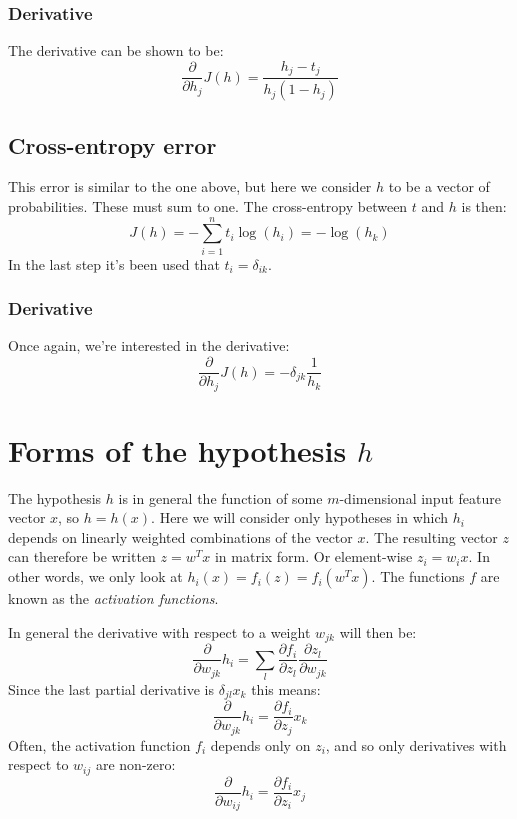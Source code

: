 \documentclass[12pt, a4paper]{article}
\numberwithin{equation}{section}
\begin{document}
\subsubsection{Derivative}
The derivative can be shown to be:
\begin{equation}
\frac{\partial}{\partial h_j}J(h)=\frac{h_j-t_j}{h_j(1-h_j)}
\end{equation}

\subsection{Cross-entropy error}
This error is similar to the one above, but here we consider $h$ to be a vector of probabilities. These must sum to one. The cross-entropy between $t$ and $h$ is then:
\begin{equation}
\label{error_crossentropy}
J(h)=-\sum_{i=1}^n t_i\log(h_i)=-\log(h_k)
\end{equation}
In the last step it's been used that $t_i=\delta_{ik}$.

\subsubsection{Derivative}
Once again, we're interested in the derivative:
\begin{equation}
\frac{\partial}{\partial h_j}J(h)=-\delta_{jk}\frac{1}{h_k}
\end{equation}

\section{Forms of the hypothesis $h$}
The hypothesis $h$ is in general the function of some $m$-dimensional input feature vector $x$, so $h=h(x)$. Here we will consider only hypotheses in which $h_i$ depends on linearly weighted combinations of the vector $x$. The resulting vector $z$ can therefore be written $z=w^T x$ in matrix form. Or element-wise $z_i=w_i x$. In other words, we only look at $h_i(x)=f_i(z)=f_i(w^T x)$. The functions $f$ are known as the \textit{activation functions}.

In general the derivative with respect to a weight $w_{jk}$ will then be:
\begin{equation}
\frac{\partial}{\partial w_{jk}}h_i=\sum_l\frac{\partial f_i}{\partial z_l}\frac{\partial z_l}{\partial w_{jk}}
\end{equation}
Since the last partial derivative is $\delta_{jl}x_k$ this means:
\begin{equation}
\label{hypothesis_derivative}
\frac{\partial}{\partial w_{jk}}h_i=\frac{\partial f_i}{\partial z_j}x_k
\end{equation}
Often, the activation function $f_i$ depends only on $z_i$, and so only derivatives with respect to $w_{ij}$ are non-zero:
\begin{equation}
\label{hypothesis_derivative2}
\frac{\partial}{\partial w_{ij}}h_i=\frac{\partial f_i}{\partial z_i}x_j
\end{equation}
\end{document}
